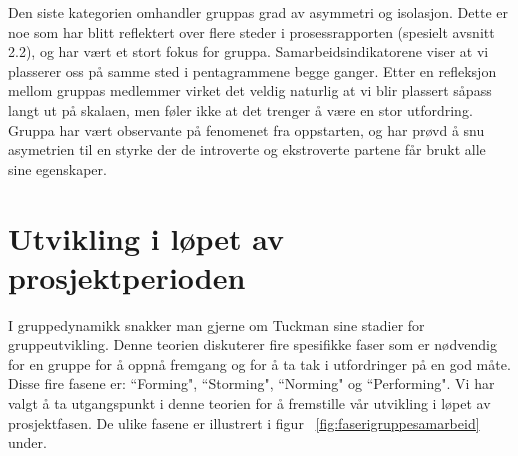 Den siste kategorien omhandler gruppas grad av asymmetri og isolasjon. Dette er noe som har blitt reflektert over flere steder i prosessrapporten (spesielt avsnitt 2.2), og har vært et stort fokus for gruppa. Samarbeidsindikatorene viser at vi plasserer oss på samme sted i pentagrammene begge ganger. Etter en refleksjon mellom gruppas medlemmer virket det veldig naturlig at vi blir plassert såpass langt ut på skalaen, men føler ikke at det trenger å være en stor utfordring. Gruppa har vært observante på fenomenet fra oppstarten, og har prøvd å snu asymetrien til en styrke der de introverte og ekstroverte partene får brukt alle sine egenskaper.\\


\section{Utvikling i løpet av prosjektperioden}
\label{sec:utvikling}
I gruppedynamikk snakker man gjerne om Tuckman sine stadier for gruppeutvikling. Denne teorien diskuterer fire spesifikke faser som er nødvendig for en gruppe for å oppnå fremgang og for å ta tak i utfordringer på en god måte. Disse fire fasene er: ``Forming", ``Storming", ``Norming" og ``Performing". Vi har valgt å ta utgangspunkt i denne teorien for å fremstille vår utvikling i løpet av prosjektfasen. De ulike fasene er illustrert i figur ~\ref{fig:faserigruppesamarbeid} under.\\

